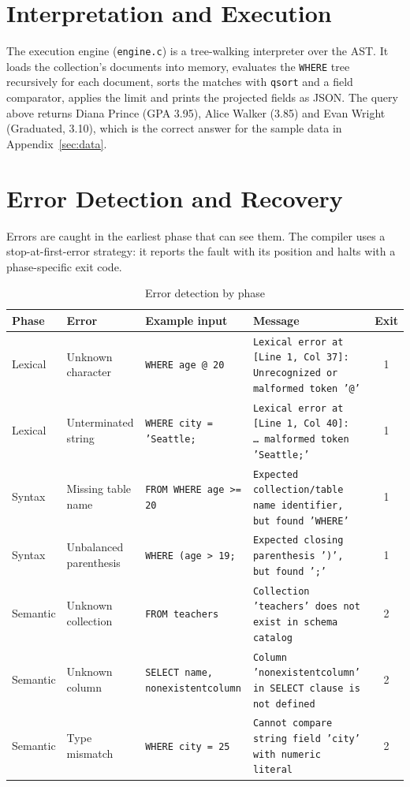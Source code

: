 \documentclass[12pt,a4paper]{report}
\newcommand{\codeus}{\textunderscore\allowbreak}
\DeclareRobustCommand{\code}[1]{\texttt{\let\_\codeus #1}}
\begin{document}
\section{Interpretation and Execution}
The execution engine (\code{engine.c}) is a tree-walking interpreter over the AST. It loads the collection's documents into memory, evaluates the \code{WHERE} tree recursively for each document, sorts the matches with \code{qsort} and a field comparator, applies the limit and prints the projected fields as JSON. The query above returns Diana Prince (GPA 3.95), Alice Walker (3.85) and Evan Wright (Graduated, 3.10), which is the correct answer for the sample data in Appendix~\ref{sec:data}.

\section{Error Detection and Recovery}
Errors are caught in the earliest phase that can see them. The compiler uses a stop-at-first-error strategy: it reports the fault with its position and halts with a phase-specific exit code.
\begin{table}[H]
\centering\footnotesize
\setlength{\tabcolsep}{4pt}
\begin{tabularx}{\linewidth}{|P{1.4cm}|P{2.1cm}|P{3.5cm}|L|c|}
\hline
\textbf{Phase} & \textbf{Error} & \textbf{Example input} & \textbf{Message} & \textbf{Exit} \\ \hline
Lexical & Unknown character & \code{WHERE age @ 20} & \code{Lexical error at [Line 1, Col 37]: Unrecognized or malformed token '@'} & 1 \\ \hline
Lexical & Unterminated string & \code{WHERE city = 'Seattle;} & \code{Lexical error at [Line 1, Col 40]: \ldots\ malformed token 'Seattle;'} & 1 \\ \hline
Syntax & Missing table name & \code{FROM WHERE age >= 20} & \code{Expected collection/table name identifier, but found 'WHERE'} & 1 \\ \hline
Syntax & Unbalanced parenthesis & \code{WHERE (age > 19;} & \code{Expected closing parenthesis ')', but found ';'} & 1 \\ \hline
Semantic & Unknown collection & \code{FROM teachers} & \code{Collection 'teachers' does not exist in schema catalog} & 2 \\ \hline
Semantic & Unknown column & \code{SELECT name, nonexistent\_column} & \code{Column 'nonexistent\_column' in SELECT clause is not defined} & 2 \\ \hline
Semantic & Type mismatch & \code{WHERE city = 25} & \code{Cannot compare string field 'city' with numeric literal} & 2 \\ \hline
\end{tabularx}
\caption{Error detection by phase}
\end{table}
\end{document}
